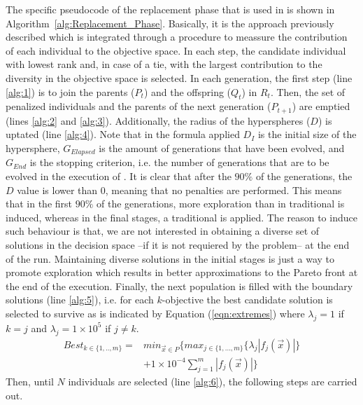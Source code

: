 The specific pseudocode of the replacement phase that is used in \VSDMOEA{} is shown in Algorithm~\ref{alg:Replacement_Phase}.
%
Basically, it is the approach previously described which is integrated through a procedure to meassure the contribution of each individual to the objective space.
%
In each step, the candidate individual with lowest rank and, in case of a tie, with the largest contribution to the diversity in the objective space is selected.
%
In each generation, the first step (line \ref{alg:1}) is to join the parents ($P_t$) and the offspring ($Q_t$) in $R_t$.
%
Then, the set of penalized individuals and the parents of the next generation ($P_{t+1}$) are emptied (lines \ref{alg:2} and \ref{alg:3}).
%
Additionally, the radius of the hyperspheres ($D$) is uptated (line \ref{alg:4}).
%
Note that in the formula applied $D_I$ is the initial size of the hypersphere, $G_{Elapsed}$ is the amount of generations that have been evolved, and $G_{End}$
is the stopping criterion, i.e. the number of generations that are to be evolved in the execution of \VSDMOEA{}.
%
It is clear that after the $90\%$ of the generations, the $D$ value is lower than 0, meaning that no penalties are performed.
%
This means that in the first $90\%$ of the generations, more exploration than in traditional \MOEAS{} is induced, whereas 
in the final stages, a traditional \MOEA{} is applied.
%
The reason to induce such behaviour is that, we are not interested in obtaining a diverse set of solutions in the decision space --if it is not requiered by the problem-- at the end of the run.
%
Maintaining diverse solutions in the initial stages is just a way to promote exploration which results in better approximations to the Pareto front at the end of the execution.
%
Finally, the next population is filled with the boundary solutions (line \ref{alg:5}), i.e. for each $k$-objective the best candidate solution is selected to survive as is indicated by Equation (\ref{eqn:extremes}) where $\lambda_j = 1$ if $k=j$ and  $\lambda_j = 1 \times 10^5$ if $j \neq k$.
\begin{equation}\label{eqn:extremes}
\begin{split}
 Best_{k \in \{1,..,m\}} = &  min_{ \vec{x} \in P} \{max_{j \in \{1, ..., m\} } \{ \lambda_j | f_j( \vec{x} ) | \} \\
& + 1 \times 10^{-4} \sum_{j=1}^m |f_j( \vec{x} ) | \}  
\end{split}
\end{equation}
%
Then, until $N$ individuals are selected (line \ref{alg:6}), the following steps are carried out.
